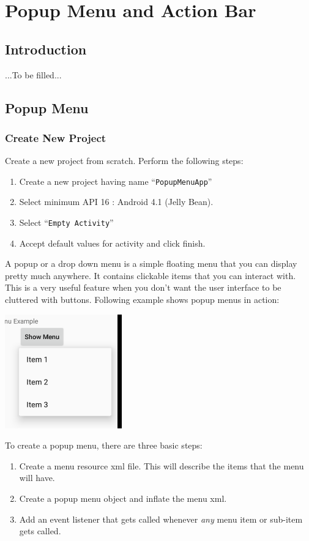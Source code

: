 \chapter{Popup Menu and Action Bar}

\section{Introduction}
...To be filled...

\section{Popup Menu}
\subsection{Create New Project}
\label{PMAB:createNewProject}
Create a new project from scratch. Perform the following steps:
\begin{enumerate}
	\item Create a new project having name ``\texttt{PopupMenuApp}''
	\item Select minimum API 16 : Android 4.1 (Jelly Bean).
	\item Select ``\texttt{Empty Activity}''
	\item Accept default values for activity and click finish. \\
\end{enumerate}

A popup or a drop down menu is a simple floating menu that you can display pretty much anywhere. It contains clickable items that you can interact with. This is a very useful feature when you don't want the user interface to be cluttered with buttons. Following example shows popup menus in action:

\begin{center}
	\includegraphics[scale=0.4]{chapters/ch07/images/37}
\end{center}

\vskip 4mm
To create a popup menu, there are three basic steps:
\begin{enumerate}
	\item Create a menu resource xml file. This will describe the items that the menu will have.
	\item Create a popup menu object and inflate the menu xml.
	\item Add an event listener that gets called whenever \textit{any} menu item or sub-item gets called.
\end{enumerate}

